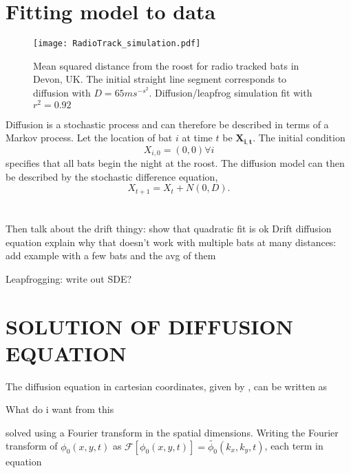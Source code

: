 \section{Fitting model to data}

\begin{figure} [h]
    \centering
        \texttt{[image: RadioTrack\_simulation.pdf]}
        \caption{Mean squared distance from the roost for radio tracked bats in Devon, UK. The initial straight line segment corresponds to diffusion with $D = 65 ms^{-s^2}$. Diffusion/leapfrog simulation fit with $r^2 = 0.92$}
    \label{fig:radiotrack_fit}
\end{figure}

Diffusion is a stochastic process and can therefore be described in terms of a Markov process. Let the location of bat $i$ at time $t$ be $\bm{X_{i,t}}$. The initial condition
\begin{equation}
X_{i,0} = (0,0)         \forall i
\end{equation}
specifies that all bats begin the night at the roost. The diffusion model can then be described by the stochastic difference equation,
\begin{equation}
X_{t+1} = X_t + N(0,D) .
\end{equation}



\section{}

Then talk about the drift thingy:
show that quadratic fit is ok
Drift diffusion equation
explain why that doesn't work with multiple bats at many distances: add example with a few bats and the avg of them

Leapfrogging: write out SDE?



\section{SOLUTION OF DIFFUSION EQUATION}

The diffusion equation in cartesian coordinates, given by , can be written as

{\huge What do i want from this}

 solved using a Fourier transform in the spatial dimensions. Writing the Fourier transform of $\phi_0(x,y,t)$ as $\mathscr{F}\left[ \phi_0(x,y,t) \right] = \tilde{\phi_0}(k_x,k_y,t)$, each term in equation

